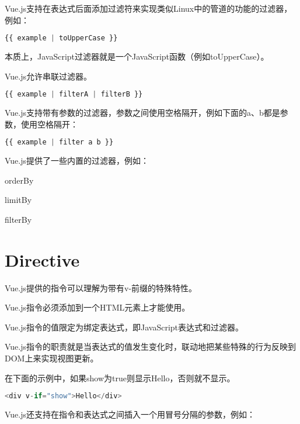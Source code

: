Vue.js支持在表达式后面添加过滤符来实现类似Linux中的管道的功能的过滤器，例如：


\begin{lstlisting}[language=JavaScript]
{{ example | toUpperCase }}
\end{lstlisting}

本质上，JavaScript过滤器就是一个JavaScript函数（例如toUpperCase）。

Vue.js允许串联过滤器。

\begin{lstlisting}[language=JavaScript]
{{ example | filterA | filterB }}
\end{lstlisting}

Vue.js支持带有参数的过滤器，参数之间使用空格隔开，例如下面的a、b都是参数，使用空格隔开：

\begin{lstlisting}[language=JavaScript]
{{ example | filter a b }}
\end{lstlisting}

Vue.js提供了一些内置的过滤器，例如：

\begin{compactitem}
\item orderBy
\item limitBy
\item filterBy
\end{compactitem}

\section{Directive}


Vue.js提供的指令可以理解为带有v-前缀的特殊特性。

\begin{compactitem}
\item Vue.js指令必须添加到一个HTML元素上才能使用。
\item Vue.js指令的值限定为绑定表达式，即JavaScript表达式和过滤器。
\item Vue.js指令的职责就是当表达式的值发生变化时，联动地把某些特殊的行为反映到DOM上来实现视图更新。
\end{compactitem}

在下面的示例中，如果show为true则显示Hello，否则就不显示。

\begin{lstlisting}[language=JavaScript]
<div v-if="show">Hello</div>
\end{lstlisting}

Vue.js还支持在指令和表达式之间插入一个用冒号分隔的参数，例如：

